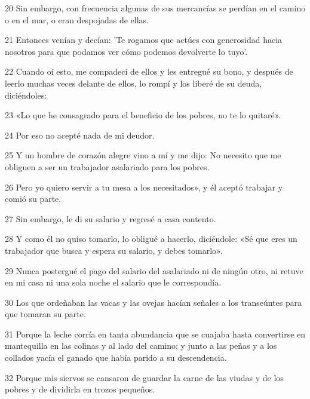 \par 20 Sin embargo, con frecuencia algunas de sus mercancías se perdían en el camino o en el mar, o eran despojadas de ellas.

\par 21 Entonces venían y decían: 'Te rogamos que actúes con generosidad hacia nosotros para que podamos ver cómo podemos devolverte lo tuyo'.

\par 22 Cuando oí esto, me compadecí de ellos y les entregué su bono, y después de leerlo muchas veces delante de ellos, lo rompí y los liberé de su deuda, diciéndoles:

\par 23 «Lo que he consagrado para el beneficio de los pobres, no te lo quitaré».

\par 24 Por eso no acepté nada de mi deudor.

\par 25 Y un hombre de corazón alegre vino a mí y me dijo: No necesito que me obliguen a ser un trabajador asalariado para los pobres.

\par 26 Pero yo quiero servir a tu mesa a los necesitados», y él aceptó trabajar y comió su parte.

\par 27 Sin embargo, le di su salario y regresé a casa contento.

\par 28 Y como él no quiso tomarlo, lo obligué a hacerlo, diciéndole: «Sé que eres un trabajador que busca y espera su salario, y debes tomarlo».

\par 29 Nunca postergué el pago del salario del asalariado ni de ningún otro, ni retuve en mi casa ni una sola noche el salario que le correspondía.

\par 30 Los que ordeñaban las vacas y las ovejas hacían señales a los transeúntes para que tomaran su parte.

\par 31 Porque la leche corría en tanta abundancia que se cuajaba hasta convertirse en mantequilla en las colinas y al lado del camino; y junto a las peñas y a los collados yacía el ganado que había parido a su descendencia.

\par 32 Porque mis siervos se cansaron de guardar la carne de las viudas y de los pobres y de dividirla en trozos pequeños.

